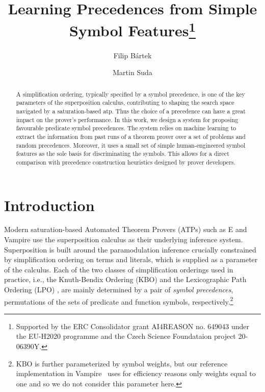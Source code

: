 

\title{Learning Precedences from Simple Symbol Features\thanks{Supported by the ERC Consolidator grant AI4REASON no. 649043 under the EU-H2020 programme and the Czech Science Foundataion project 20-06390Y.}}
\author{Filip B\'{a}rtek \and Martin Suda}



\maketitle

\begin{abstract}
A simplification ordering, typically specified by a symbol precedence,
is one of the key parameters of the superposition calculus, contributing
to shaping the search space navigated by a saturation-based \acrlong{atp}.
Thus the choice of a precedence can have a great impact on the prover's performance.
In this work, we design a system for proposing favourable predicate symbol precedences.
The system relies on machine learning to extract the information from
past runs of a theorem prover over a set of problems and random precedences.
Moreover, it uses a small set of simple human-engineered symbol features as the sole
basis for discriminating the symbols. This allows for a direct comparison
with precedence construction heuristics designed by prover developers.
\end{abstract}

\section{Introduction}

Modern saturation-based Automated Theorem Provers (ATPs) such as E \cite{SCV:CADE-2019} and Vampire \cite{Kovacs2013}
use the superposition calculus \cite{Nieuwenhuis2001} as their underlying inference system.
Superposition is built around the paramodulation inference \cite{Robinson1983} crucially
constrained by simplification ordering on terms and literals, which is supplied as a parameter of the calculus.
Each of the two classes of simplification orderings used in practice,
i.e., the Knuth-Bendix Ordering (KBO) \cite{Knuth1983}
and the Lexicographic Path Ordering (LPO) \cite{Kamin1980},
are mainly determined by a pair of \emph{symbol precedences}, permutations of the sets of predicate and function symbols,
respectively.\footnote{
KBO is further parameterized by symbol weights, but our reference implementation in Vampire~\cite{Kovacs2013} 
uses for efficiency reasons only weights equal to one \cite{DBLP:conf/cade/KovacsMV11} and so we do not consider this parameter here.}

